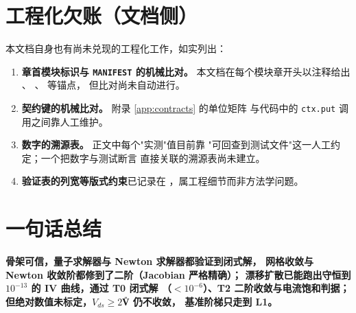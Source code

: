 \section{工程化欠账（文档侧）}

本文档自身也有尚未兑现的工程化工作，如实列出：

\begin{enumerate}[leftmargin=1.9em,itemsep=0.4em,topsep=0.4em]
  \item \textbf{章首模块标识与 \texttt{MANIFEST} 的机械比对。}
        本文档在每个模块章开头以注释给出 、
        、 等锚点，
        但比对尚未自动进行。
  \item \textbf{契约键的机械比对。} 附录 \ref{app:contracts} 的单位矩阵
        与代码中的 \texttt{ctx.put} 调用之间靠人工维护。
  \item \textbf{数字的溯源表。} 正文中每个"实测"值目前靠
        "可回查到测试文件"这一人工约定；一个把数字与测试断言
        直接关联的溯源表尚未建立。
  \item \textbf{验证表的列宽等版式约束}已记录在
        ，属工程细节而非方法学问题。
\end{enumerate}

\section{一句话总结}

\textbf{骨架可信，量子求解器与 Newton 求解器都验证到闭式解，
网格收敛与 Newton 收敛阶都修到了二阶（Jacobian 严格精确）；
漂移扩散已能跑出守恒到 $10^{-13}$ 的 IV 曲线，通过 T0 闭式解
（$<10^{-6}$）、T2 二阶收敛与电流饱和判据；
但绝对数值未标定，$V_{ds}\ge2$\U{V} 仍不收敛，
基准阶梯只走到 L1。}

\cleardoublepage
